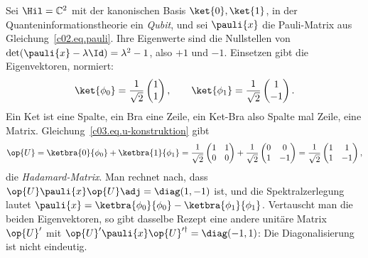 \begin{example}\label{c03.ex.hadamard}
  Sei $\Hil = \mathbb{C}^2$ mit der kanonischen Basis $\ket{0}, \ket{1}$, in der
  Quanteninformationstheorie ein \emph{Qubit}, und sei $\pauli{x}$ die Pauli-Matrix aus
  Gleichung~\eqref{c02.eq.pauli}. Ihre Eigenwerte sind die Nullstellen von
  $\det(\pauli{x} - \lambda\Id) = \lambda^2 - 1$, also $+1$ und $-1$. Einsetzen gibt die
  Eigenvektoren, normiert:
  \begin{equation}\label{c03.eq.hadamard-eigen}
    \ket{\phi_0} = \frac{1}{\sqrt{2}} \begin{pmatrix} 1 \\ 1 \end{pmatrix} ,
    \qquad
    \ket{\phi_1} = \frac{1}{\sqrt{2}} \begin{pmatrix} 1 \\ -1 \end{pmatrix} .
  \end{equation}
  Ein Ket ist eine Spalte, ein Bra eine Zeile, ein Ket-Bra also Spalte mal Zeile, eine Matrix.
  Gleichung~\eqref{c03.eq.u-konstruktion} gibt
  \begin{equation}\label{c03.eq.hadamard}
    \op{U}
    = \ketbra{0}{\phi_0} + \ketbra{1}{\phi_1}
    = \frac{1}{\sqrt{2}} \begin{pmatrix} 1 & 1 \\ 0 & 0 \end{pmatrix}
    + \frac{1}{\sqrt{2}} \begin{pmatrix} 0 & 0 \\ 1 & -1 \end{pmatrix}
    = \frac{1}{\sqrt{2}} \begin{pmatrix} 1 & 1 \\ 1 & -1 \end{pmatrix} ,
  \end{equation}
  die \emph{Hadamard-Matrix}. Man rechnet nach, dass $\op{U}\pauli{x}\op{U}\adj = \diag(1, -1)$
  ist, und die Spektralzerlegung lautet
  $\pauli{x} = \ketbra{\phi_0}{\phi_0} - \ketbra{\phi_1}{\phi_1}$. Vertauscht man die beiden
  Eigenvektoren, so gibt dasselbe Rezept eine andere unitäre Matrix $\op{U}'$ mit
  $\op{U}'\pauli{x}\op{U}'^{\dagger} = \diag(-1, 1)$: Die Diagonalisierung ist nicht eindeutig.
\end{example}

